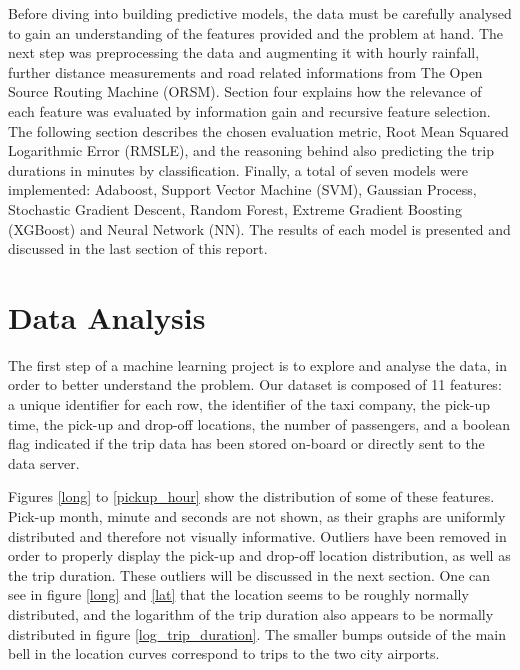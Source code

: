 \documentclass[a4paper]{article}
\begin{document}
Before diving into building predictive models, the data must be carefully
analysed to gain an understanding of the features provided and the problem at
hand. The next step was preprocessing the data and augmenting it with hourly
rainfall, further distance measurements and road related informations from The
Open Source Routing Machine (ORSM). Section four explains how the relevance of
each feature was evaluated by information gain and recursive feature selection.
The following section describes the chosen evaluation metric, Root Mean Squared
Logarithmic Error (RMSLE), and the reasoning behind also predicting the trip
durations in minutes by classification. Finally, a total of seven models were
implemented: Adaboost, Support Vector Machine (SVM), Gaussian Process,
Stochastic Gradient Descent, Random Forest, Extreme Gradient Boosting (XGBoost)
and Neural Network (NN). The results of each model is presented and discussed in
the last section of this report.


\section{Data Analysis}
The first step of a machine learning project is to explore and analyse the data,
in order to better understand the problem. Our dataset is composed of 11
features: a unique identifier for each row, the identifier of the taxi company,
the pick-up time, the pick-up and drop-off locations, the number of passengers,
and a boolean flag indicated if the trip data has been stored on-board or
directly sent to the data server.

Figures \ref{long} to \ref{pickup_hour} show the distribution of some of these
features. Pick-up month, minute and seconds are not shown, as their graphs
are uniformly distributed and therefore not visually informative. Outliers have
been removed in order to properly display the pick-up and drop-off location
distribution, as well as the trip duration. These outliers will be discussed in
the next section. One can see in figure \ref{long} and \ref{lat} that the
location seems to be roughly normally distributed, and the logarithm of the trip
duration also appears to be normally distributed in figure
\ref{log_trip_duration}. The smaller bumps outside of the main bell in the
location curves correspond to trips to the two city airports.
\end{document}
